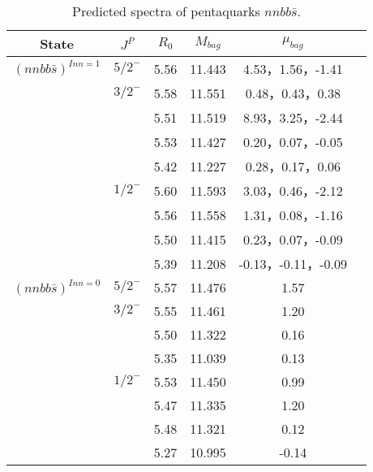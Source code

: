 \documentclass[prd,twocolumn,floatfix,nofootinbib]{revtex4}
\begin{document}
\begin{table*}[!htbp]
    \caption{Predicted spectra of pentaquarks $nnbb\bar{s}$.}
    \begin{tabular}{cccccc}
        \hline\hline
        {\rm State} &$J^{P}$ &$R_{0}$ &$M_{bag}$ &$\mu_{bag}$  \\ \hline
        ${(nnbb\bar{s})}^{I{nn}=1}$
            &${5/2}^{-}$     &5.56   &11.443 &4.53，1.56，-1.41  \\                
            &${3/2}^{-}$     &5.58   &11.551 &0.48，0.43，0.38 \\
                         &$ $     &5.51   &11.519 &8.93，3.25，-2.44  \\
                         &$ $     &5.53   &11.427 &0.20，0.07，-0.05  \\
                         &$ $     &5.42   &11.227 &0.28，0.17，0.06\\
            &${1/2}^{-}$     &5.60   &11.593 &3.03，0.46，-2.12  \\
                         &$ $     &5.56   &11.558 &1.31，0.08，-1.16  \\
                         &$ $     &5.50   &11.415 &0.23，0.07，-0.09  \\
                         &$ $     &5.39   &11.208 &-0.13，-0.11，-0.09 \\
            ${(nnbb\bar{s})}^{I{nn}=0}$
            &${5/2}^{-}$     &5.57   &11.476 &1.57  \\                
            &${3/2}^{-}$     &5.55   &11.461 &1.20 \\
                         &$ $     &5.50   &11.322 &0.16  \\
                         &$ $     &5.35   &11.039 &0.13  \\
            &${1/2}^{-}$     &5.53   &11.450 &0.99  \\
                         &$ $     &5.47   &11.335 &1.20  \\
                         &$ $     &5.48   &11.321 &0.12  \\
                         &$ $     &5.27   &10.995 &-0.14 \\
       \hline\hline
    \end{tabular}
\end{table*}
\end{document}
